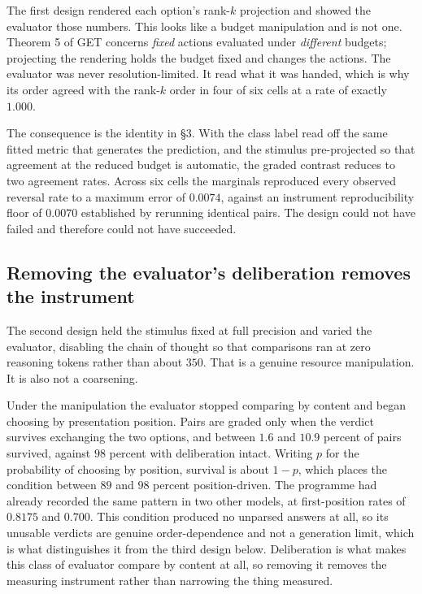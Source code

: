 \documentclass[11pt,letterpaper]{article}
\theoremstyle{plain}
\theoremstyle{definition}
\begin{document}
The first design rendered each option's rank-$k$ projection and showed the
evaluator those numbers. This looks like a budget manipulation and is not one.
Theorem 5 of GET concerns \emph{fixed} actions evaluated under \emph{different}
budgets; projecting the rendering holds the budget fixed and changes the actions.
The evaluator was never resolution-limited. It read what it was handed, which is
why its order agreed with the rank-$k$ order in four of six cells at a rate of
exactly $1.000$.

The consequence is the identity in \S3. With the class label read off the same
fitted metric that generates the prediction, and the stimulus pre-projected so
that agreement at the reduced budget is automatic, the graded contrast reduces to
two agreement rates. Across six cells the marginals reproduced every observed
reversal rate to a maximum error of $0.0074$, against an instrument
reproducibility floor of $0.0070$ established by rerunning identical pairs. The
design could not have failed and therefore could not have succeeded.

\subsection*{Removing the evaluator's deliberation removes the instrument}

The second design held the stimulus fixed at full precision and varied the
evaluator, disabling the chain of thought so that comparisons ran at zero
reasoning tokens rather than about $350$. That is a genuine resource
manipulation. It is also not a coarsening.

Under the manipulation the evaluator stopped comparing by content and began
choosing by presentation position. Pairs are graded only when the verdict
survives exchanging the two options, and between $1.6$ and $10.9$ percent of
pairs survived, against $98$ percent with deliberation intact. Writing $p$ for
the probability of choosing by position, survival is about $1-p$, which places
the condition between $89$ and $98$ percent position-driven. The programme had
already recorded the same pattern in two other models, at first-position rates
of $0.8175$ and $0.700$. This condition produced no unparsed answers at all, so
its unusable verdicts are genuine order-dependence and not a generation limit,
which is what distinguishes it from the third design below. Deliberation is what makes this class of evaluator
compare by content at all, so removing it removes the measuring instrument rather
than narrowing the thing measured.
\end{document}
